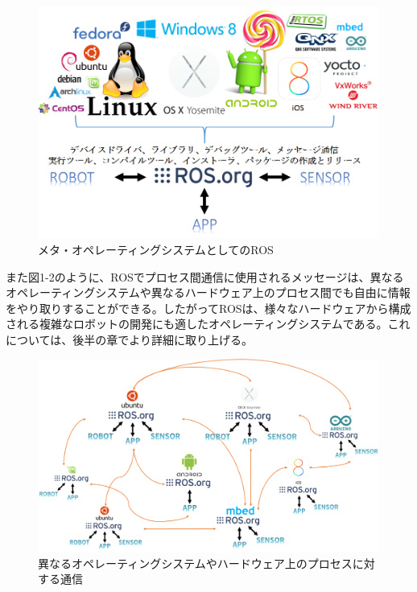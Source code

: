 \begin{figure}[h]
  \centering
  \includegraphics[width=\columnwidth]{pictures/chapter1/pic_01_01.png}
  \caption{メタ・オペレーティングシステムとしてのROS}
\end{figure}


また図1-2のように、ROSでプロセス間通信に使用されるメッセージは、異なるオペレーティングシステムや異なるハードウェア上のプロセス間でも自由に情報をやり取りすることができる。したがってROSは、様々なハードウェアから構成される複雑なロボットの開発にも適したオペレーティングシステムである。これについては、後半の章でより詳細に取り上げる。

\begin{figure}[h]
  \centering
  \includegraphics[width=\columnwidth]{pictures/chapter1/pic_01_02.png}
  \caption{異なるオペレーティングシステムやハードウェア上のプロセスに対する通信}
\end{figure}

